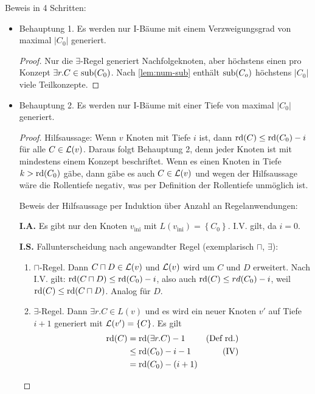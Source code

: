 Beweis in 4 Schritten:
\begin{itemize}
    \item Behauptung 1.
  Es werden nur I-Bäume mit einem Verzweigungsgrad
  von maximal $|C_0|$ generiert.
  \begin{tafel} \begin{proof}
        Nur die $\exists$-Regel generiert Nachfolgeknoten, aber
        höchstens einen pro Konzept $\exists r.C \in \operatorname{sub}(C_0)$. Nach
        \autoref{lem:num-sub}  enthält
        $\sub\left( C_{o} \right)$ höchstens $\left| C_{0} \right|$
        viele Teilkonzepte.
    \end{proof}\end{tafel}
\item Behauptung 2.
  Es werden nur I-Bäume mit einer Tiefe von maximal $\left| C_{0} \right|$
  generiert.
  \begin{tafel}\begin{proof}
        Hilfsaussage: Wenn $v$ Knoten mit Tiefe $i$ ist, dann $\operatorname{rd}(C) \leq \operatorname{rd}(C_0) - i$ für alle $C \in \mathcal{L}(v)$. Daraus folgt Behauptung 2, denn jeder Knoten ist mit mindestens einem Konzept beschriftet. Wenn es einen Knoten in Tiefe $k > \operatorname{rd}(C_0)$ gäbe, dann gäbe es auch $C\in \mathcal{L}(v)$ und wegen der Hilfsaussage wäre die Rollentiefe negativ, was per Definition der Rollentiefe unmöglich ist.

        Beweis der Hilfsaussage per Induktion über Anzahl an Regelanwendungen:

        \textbf{I.A.} Es gibt nur den Knoten $v_{\text{ini}}$ mit
$L\left( v_{\text{ini}} \right) = \left\{ C_{0} \right\}$. I.V. gilt,
da $i = 0$.

\textbf{I.S.} Fallunterscheidung nach angewandter Regel (exemplarisch
$\sqcap$, $\exists$):

\begin{enumerate}
\item $\sqcap$-Regel. Dann $C \sqcap D \in \mathcal{L}(v)$ und $\mathcal{L}(v)$ wird um $C$ und $D$ erweitert.
Nach I.V. gilt: $\rd\left( C \sqcap D \right) \leq \rd\left( C_{0} \right) - i$,
also auch $\rd\left( C \right) \leq rd\left( C_{0} \right) - i$,
weil $\rd\left( C \right) \leq \rd\left( C \sqcap D \right)$.
Analog für $D$.

\item $\exists$-Regel. Dann $\exists r.C \in L\left( v \right)$ und es wird
    ein neuer Knoten $v'$ auf Tiefe $i + 1$ generiert mit
$\ML\left( v' \right) = \left\{ C \right\}$. Es gilt
\begin{align*}
    \rd\left( C \right) &= \rd\left( \exists r.C \right) - 1 & \text{(Def rd.)}\\
                        &\leq \rd\left( C_{0} \right) - i - 1 & \text{(IV)}\\
                        &= \rd\left( C_{0} \right) - (i + 1)
\end{align*} \end{enumerate} \end{proof}
\end{tafel}


\end{itemize}
